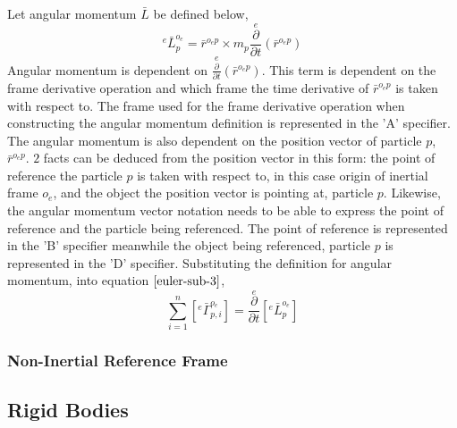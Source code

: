 \documentclass[class=report, 12pt, crop=false]{standalone}
\begin{document}
\begin{center}
Let angular momentum $\bar{L}$ be defined below,
$${}^{e}\bar{L}^{o_{e}}_{p} = \bar{r}^{o_{e}p}\times m_{p}\overset{e}{\frac{\partial}{\partial t}}\left(\bar{r}^{o_{e}p}\right)$$
Angular momentum is dependent on $\displaystyle \overset{e}{\frac{\partial}{\partial t}}\left(\bar{r}^{o_{e}p}\right)$. This term is dependent on the frame derivative operation and which frame the time derivative of $\displaystyle \bar{r}^{o_{e}p}$ is taken with respect to. The frame used for the frame derivative operation when constructing the angular momentum definition is represented in the 'A' specifier. The angular momentum is also dependent on the position vector of particle $p$, $\displaystyle \bar{r}^{o_{e}p}$. $2$ facts can be deduced from the position vector in this form: the point of reference the particle $p$ is taken with respect to, in this case origin of inertial frame $o_{e}$, and the object the position vector is pointing at, particle $p$. Likewise, the angular momentum vector notation needs to be able to express the point of reference and the particle being referenced. The point of reference is represented in the 'B' specifier meanwhile the object being referenced, particle $p$ is represented in the 'D' specifier. Substituting the definition for angular momentum, into equation $\ref{euler-sub-3}$,
$$\sum^{n}_{i = 1}\left[{}^{e}\bar{\Gamma}^{o_{e}}_{p,i}\right] = \overset{e}{\frac{\partial}{\partial t}}\left[{}^{e}\bar{L}^{o_{e}}_{p}\right]$$
\subsubsection{Non-Inertial Reference Frame}
\begin{comment}
\end{comment}
\subsection{Rigid Bodies}
\begin{comment}
Kind of incomplete, more information about the colinear argument need to be made
\end{comment}

\end{center}
\end{document}
